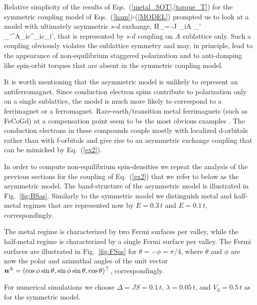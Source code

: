 Relative simplicity of the results of Eqs.~(\ref{metal_SOT},\ref{torque_T}) for the symmetric coupling model of Eqs.~(\ref{ham})-(\ref{MODEL}) prompted us to look at a model with ultimately asymmetric $s$-$d$ exchange,
\be
H_=\,-J \s_{i\in A }  \s_{\sigma\sigma'} \bb{\sigma}_{\sigma\sigma'}^\textrm{A}_i\cdot c^\dagger_{i\sigma}c\0_{i\sigma'},
\label{ex2}
\e
that is represented by $s$-$d$ coupling on $A$ sublattice only. Such a coupling obviously violates the sublattice symmetry and may, in principle, lead to the appearance of non-equilibrium staggered polarization and to anti-damping like spin-orbit torques that are absent in the symmetric coupling model. 

It is worth mentioning that the asymmetric model is unlikely to represent an antiferromagnet. Since conduction electron spins contribute to polarization only on a single sublattice, the model is much more likely to correspond to a ferrimagnet or a ferromagnet.  Rare-earth/transition metal ferrimagnets (such as FeCoGd) at a compensation point seem to be the most obvious examples \cite{Hoffman2018}. The conduction electrons in these compounds couple mostly with localized d-orbitals rather than with f-orbitals and give rise to an asymmetric exchange coupling that can be mimicked by Eq.~(\ref{ex2}). 

In order to compute non-equilibrium spin-densities we repeat the analysis of the previous sections for the coupling of Eq.~(\ref{ex2}) that we refer to below as the asymmetric model. The band-structure of the asymmetric model is illustrated in Fig.~\ref{fig:BSas}. Similarly to the symmetric model we distinguish metal and half-metal regimes that are represented now by $E=0.3\,t$ and $E=0.1\,t$, correspondingly. 

The metal regime is characterized by two Fermi surfaces per valley, while the half-metal regime is characterized by a single Fermi surface per valley. The Fermi surfaces are illustrated in Fig.~\ref{fig:FSas} for $\theta=-\phi=\pi/4$, where $\theta$ and $\phi$ are now the polar and azimuthal angles of the unit vector $\boldsymbol{n}^\textrm{A}=(\cos\phi\sin\theta,\sin\phi\sin\theta,\cos\theta)^\top$, correspondingly. 

For numerical simulations we choose $\Delta= J S=0.1\,t$, $\lambda=0.05\,t$, and $V_\textrm{d}=0.5\,t$ as for the symmetric model. 

